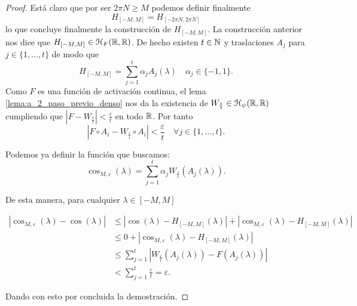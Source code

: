 \begin{proof}
    Está claro que por ser $2 \pi N \geq M$ podemos definir 
    finalmente 
    \begin{equation}
        H_{[-M, M]} = H_{[-2\pi N, 2 \pi N]}
    \end{equation}
    lo que concluye finalmente la construcción de $H_{[-M, M]}.$
    La construcción anterior nos dice que 
    $H_{[-M, M]} \in \mathcal{H}_F{(\mathbb{R}, \mathbb{R})}$. 
    De hecho existen $t \in \mathbb{N}$ y traslaciones $A_j$ para 
    $j \in \{1, \ldots, t\}$ de modo que 
    \begin{equation}
        H_{[-M, M]} = \sum_{j=1}^t \alpha_j A_j(\lambda) 
        \quad 
        \alpha_j \in \{-1,1\}. 
    \end{equation}
    Como $F$ es una función de activación continua, el lema \ref{lema:a_2_paso_previo_denso}
    nos da la existencia de 
    $W_\frac{\varepsilon}{t} \in \mathcal{H}_\psi{(\mathbb{R}, \mathbb{R})}$ cumpliendo que 
    $|F - W_{ \frac{\varepsilon}{t}} | < \frac{\varepsilon}{t}$ en todo $\mathbb{R}$.
    Por tanto 
    \begin{equation}
        |F \circ A_i - W_{ \frac{\varepsilon}{t}} \circ A_i |
         < \frac{\varepsilon}{t}
         \quad 
         \forall j \in \{1, \ldots, t\}
         . 
    \end{equation}

Podemos ya definir la función que buscamos: 
    \begin{equation}
        \cos_{M, \varepsilon}(\lambda) = \sum_{j=1}^t 
        \alpha_j  W_{ \frac{\varepsilon}{t}}(A_j(\lambda)). 
    \end{equation}

    De esta manera, para cualquier $\lambda \in [-M, M]$

    \begin{equation}
        \begin{split}
            |\cos_{M,\varepsilon}(\lambda) - \cos(\lambda)| 
            &\leq
            |\cos(\lambda) -  H_{[- M, M]}(\lambda)|
            + 
            | \cos_{M,\varepsilon}(\lambda) -  H_{[- M, M]}(\lambda)|  \\
            &\leq  0 
            + | \cos_{M,\varepsilon}(\lambda) -  H_{[- M, M]}(\lambda)| \\
            & \leq  \sum_{j=1}^t 
            |  W_{ \frac{\varepsilon}{t}}(A_j(\lambda)) 
            -
            F( A_j(\lambda))
             | \\
             & <   \sum_{j=1}^t \frac{\varepsilon}{t} = \varepsilon .
        \end{split}
    \end{equation}

    Dando con esto por concluida la demostración. 
\end{proof}

